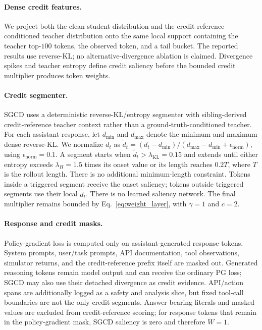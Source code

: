 \paragraph{Dense credit features.} We project both the clean-student distribution
and the credit-reference-conditioned teacher distribution onto the same local
support containing the teacher top-$100$ tokens, the observed token, and a tail bucket.
The reported results use reverse-KL; no alternative-divergence ablation is
claimed. Divergence spikes and teacher
entropy define credit saliency before the bounded credit multiplier produces
token weights.

\paragraph{Credit segmenter.} SGCD uses a deterministic reverse-KL/entropy
segmenter with sibling-derived credit-reference teacher context rather than a
ground-truth-conditioned teacher. For each assistant response, let $d_{\min}$
and $d_{\max}$ denote the minimum and maximum dense reverse-KL. We normalize
$d_t$ as $\tilde d_t=(d_t-d_{\min})/(d_{\max}-d_{\min}+\epsilon_{\mathrm{norm}})$,
using $\epsilon_{\mathrm{norm}}=0.1$. A segment starts when
$\tilde d_t>\lambda_{\mathrm{KL}}=0.15$ and extends until either entropy exceeds
$\lambda_H=1.5$ times its onset value or its length reaches $0.2T$, where $T$ is
the rollout length. There is no additional minimum-length constraint. Tokens inside a triggered segment receive the
onset saliency; tokens outside triggered segments use their local
$\tilde d_t$. There is no learned saliency network. The final multiplier remains
bounded by Eq.~\ref{eq:weight_layer}, with $\gamma{=}1$ and $c{=}2$.

\paragraph{Response and credit masks.} Policy-gradient loss is computed only on
assistant-generated response tokens. System prompts, user/task prompts, API
documentation, tool observations, simulator returns, and the credit-reference
prefix itself are masked out. Generated reasoning tokens remain model output and
can receive the ordinary PG loss; SGCD may also use their detached divergence as
credit evidence. API/action spans are additionally logged as a safety and
analysis slice, but fixed tool-call boundaries are not the only credit segments.
Answer-bearing literals and masked values are excluded from credit-reference
scoring; for response tokens that remain in the policy-gradient mask, SGCD
saliency is zero and therefore $W=1$.

